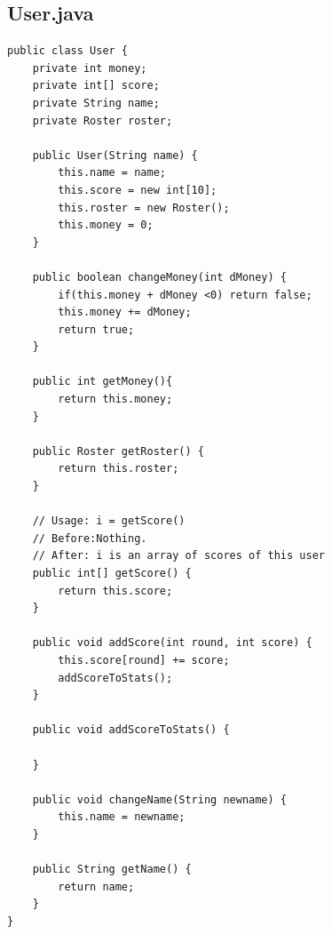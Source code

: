 \documentclass{article}
\begin{document}
\newpage\subsection*{User.java}
\begin{lstlisting}
public class User {
	private int money;
	private int[] score;
	private String name;
	private Roster roster;
	
	public User(String name) {
		this.name = name;
		this.score = new int[10];
		this.roster = new Roster();
		this.money = 0;
	}
	
	public boolean changeMoney(int dMoney) {
		if(this.money + dMoney <0) return false;
		this.money += dMoney;
		return true;
	}
	
	public int getMoney(){
		return this.money;
	}
	
	public Roster getRoster() {
		return this.roster;
	}

	// Usage: i = getScore()
	// Before:Nothing.
	// After: i is an array of scores of this user
	public int[] getScore() {
		return this.score;
	}
	
	public void addScore(int round, int score) {
		this.score[round] += score;
		addScoreToStats();
	}
	
	public void addScoreToStats() {
		
	}
	
	public void changeName(String newname) {
		this.name = newname;
	}
	
	public String getName() {
		return name;
	}
}
\end{lstlisting}

\newpage
\end{document}
